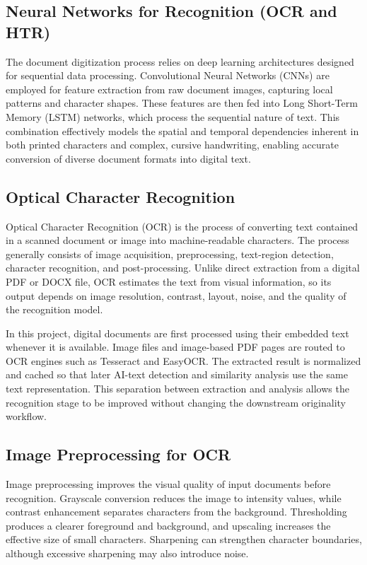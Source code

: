 \documentclass[12pt, a4paper]{report}
\numberwithin{equation}{chapter}
\begin{document}
\subsection{Neural Networks for Recognition (OCR and HTR)}
The document digitization process relies on deep learning architectures designed for sequential data processing. Convolutional Neural Networks (CNNs) are employed for feature extraction from raw document images, capturing local patterns and character shapes. These features are then fed into Long Short-Term Memory (LSTM) networks, which process the sequential nature of text. This combination effectively models the spatial and temporal dependencies inherent in both printed characters and complex, cursive handwriting, enabling accurate conversion of diverse document formats into digital text.

\subsection{Optical Character Recognition}
Optical Character Recognition (OCR) is the process of converting text contained in a scanned document or image into machine-readable characters. The process generally consists of image acquisition, preprocessing, text-region detection, character recognition, and post-processing. Unlike direct extraction from a digital PDF or DOCX file, OCR estimates the text from visual information, so its output depends on image resolution, contrast, layout, noise, and the quality of the recognition model.

In this project, digital documents are first processed using their embedded text whenever it is available. Image files and image-based PDF pages are routed to OCR engines such as Tesseract and EasyOCR. The extracted result is normalized and cached so that later AI-text detection and similarity analysis use the same text representation. This separation between extraction and analysis allows the recognition stage to be improved without changing the downstream originality workflow.

\subsection{Image Preprocessing for OCR}
Image preprocessing improves the visual quality of input documents before recognition. Grayscale conversion reduces the image to intensity values, while contrast enhancement separates characters from the background. Thresholding produces a clearer foreground and background, and upscaling increases the effective size of small characters. Sharpening can strengthen character boundaries, although excessive sharpening may also introduce noise.
\end{document}
